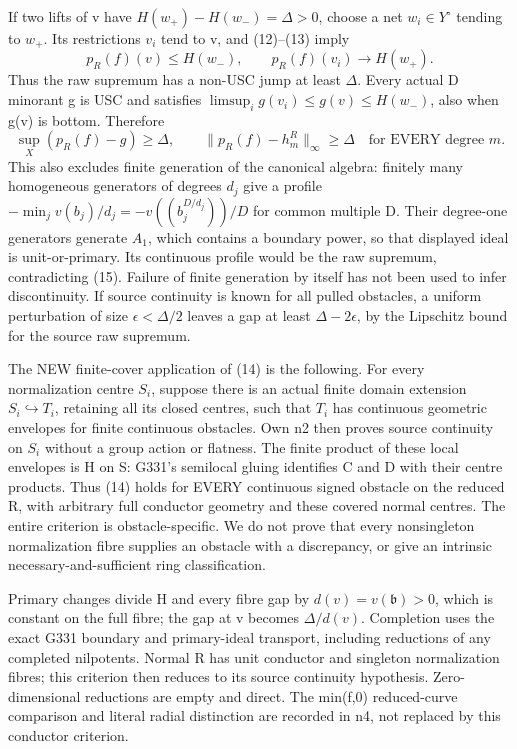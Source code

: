 \documentclass[11pt]{article}
\begin{document}
If two lifts of v have $H(w_+)-H(w_-)=\Delta>0$, choose a net
$w_i\in Y^\circ$ tending to $w_+$. Its restrictions $v_i$ tend to v,
and (12)--(13) imply
\[
 p_R(f)(v)\le H(w_-),\qquad p_R(f)(v_i)\longrightarrow H(w_+).
\]
Thus the raw supremum has a non-USC jump at least $\Delta$.
Every actual D minorant g is USC and satisfies
$\limsup_i g(v_i)\le g(v)\le H(w_-)$, also when g(v) is bottom.
Therefore
\[
       \sup_X(p_R(f)-g)\ge\Delta,
       \qquad \|p_R(f)-h_m^R\|_\infty\ge\Delta
       \quad\text{for EVERY degree }m.                     \tag{15}
\]
This also excludes finite generation of the canonical algebra: finitely
many homogeneous generators of degrees $d_j$ give a profile
$-\min_j v(b_j)/d_j=-v((b_j^{D/d_j}))/D$ for common multiple D.
Their degree-one generators generate $A_1$, which contains a boundary
power, so that displayed ideal is unit-or-primary. Its continuous profile
would be the raw supremum, contradicting (15). Failure of finite
generation by itself has not been used to infer discontinuity.
If source continuity is known for all pulled obstacles, a uniform
perturbation of size $\epsilon<\Delta/2$ leaves a gap at least
$\Delta-2\epsilon$, by the Lipschitz bound for the source raw supremum.

The NEW finite-cover application of (14) is the following. For every
normalization centre $S_i$, suppose there is an actual finite domain
extension $S_i\hookrightarrow T_i$, retaining all its closed centres,
such that $T_i$ has continuous geometric envelopes for finite continuous
obstacles. Own n2 then proves source continuity on $S_i$ without a group
action or flatness. The finite product of these local envelopes is H on S:
G331's semilocal gluing identifies C and D with their centre products.
Thus (14) holds for EVERY continuous signed obstacle on the reduced R,
with arbitrary full conductor geometry and these covered normal centres.
The entire criterion is obstacle-specific. We do not prove that every
nonsingleton normalization fibre supplies an obstacle with a discrepancy,
or give an intrinsic necessary-and-sufficient ring classification.

Primary changes divide H and every fibre gap by
$d(v)=v(\mathfrak b)>0$, which is constant on the full fibre;
the gap at v becomes $\Delta/d(v)$. Completion uses the exact G331
boundary and primary-ideal transport, including reductions of any
completed nilpotents. Normal R has unit conductor and singleton
normalization fibres; this criterion then reduces to its source
continuity hypothesis. Zero-dimensional reductions are empty and direct.
The min(f,0) reduced-curve comparison and literal radial distinction are
recorded in n4, not replaced by this conductor criterion.
\end{document}
